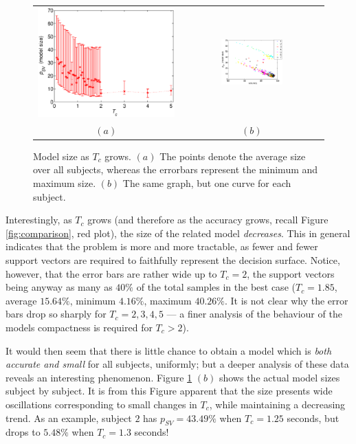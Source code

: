 \documentclass[a4paper,10pt,conference]{ieeeconf}
\begin{document}
\begin{figure}[!t]
  \begin{center}
    \begin{tabular}{cc}
      \includegraphics[width=0.45\linewidth]{SVs.eps} &
      \includegraphics[width=0.45\textwidth]{svs_subj.eps} \\
      $(a)$ & $(b)$
    \end{tabular}
    \caption{Model size as $T_c$ grows. $(a)$ The points denote the
    average size over all subjects, whereas the errorbars represent
    the minimum and maximum size. $(b)$ The same graph, but one curve
    for each subject.}
    \label{fig:svs}
  \end{center}
\end{figure}

Interestingly, as $T_c$ grows (and therefore as the accuracy grows,
recall Figure \ref{fig:comparison}, red plot), the size of the related
model \emph{decreases}. This in general indicates that the problem is
more and more tractable, as fewer and fewer support vectors are
required to faithfully represent the decision surface. Notice,
however, that the error bars are rather wide up to $T_c=2$, the
support vectors being anyway as many as $40\%$ of the total samples in
the best case ($T_c=1.85$, average $15.64\%$, minimum $4.16\%$,
maximum $40.26\%$. It is not clear why the error bars drop so sharply
for $T_c=2,3,4,5$ --- a finer analysis of the behaviour of the models
compactness is required for $T_c>2$).

It would then seem that there is little chance to obtain a model which
is \emph{both accurate and small} for all subjects, uniformly; but a
deeper analysis of these data reveals an interesting
phenomenon. Figure \ref{fig:svs} $(b)$ shows the actual model sizes
subject by subject. It is from this Figure apparent that the size
presents wide oscillations corresponding to small changes in $T_c$,
while maintaining a decreasing trend. As an example, subject $2$ has
$p_{SV}=43.49\%$ when $T_c=1.25$ seconds, but drops to $5.48\%$ when
$T_c=1.3$ seconds!
\end{document}
